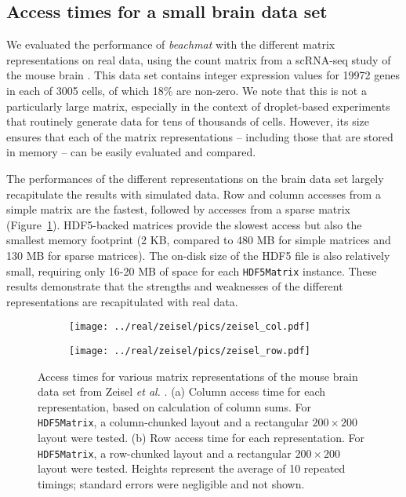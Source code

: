 \documentclass[10pt,letterpaper]{article}
\newcommand{\beachmat}{\textit{beachmat}}
\newcommand{\code}[1]{\texttt{#1}}
\begin{document}
\subsection*{Access times for a small brain data set}
We evaluated the performance of \beachmat{} with the different matrix representations on real data, using the count matrix from a scRNA-seq study of the mouse brain \cite{zeisel2015brain}.
This data set contains integer expression values for 19972 genes in each of 3005 cells, of which 18\% are non-zero.
We note that this is not a particularly large matrix, especially in the context of droplet-based experiments that routinely generate data for tens of thousands of cells.
However, its size ensures that each of the matrix representations -- including those that are stored in memory -- can be easily evaluated and compared.

The performances of the different representations on the brain data set largely recapitulate the results with simulated data.
Row and column accesses from a simple matrix are the fastest, followed by accesses from a sparse matrix (Figure~\ref{fig:zeisel}).
HDF5-backed matrices provide the slowest access but also the smallest memory footprint (2 KB, compared to 480 MB for simple matrices and 130 MB for sparse matrices).
The on-disk size of the HDF5 file is also relatively small, requiring only 16-20 MB of space for each \code{HDF5Matrix} instance. 
These results demonstrate that the strengths and weaknesses of the different representations are recapitulated with real data.

\begin{figure}[bt]
    \begin{subfigure}[b]{0.49\textwidth}
        \texttt{[image: ../real/zeisel/pics/zeisel\_col.pdf]}
        \caption{}
    \end{subfigure}
    \begin{subfigure}[b]{0.49\textwidth}
        \texttt{[image: ../real/zeisel/pics/zeisel\_row.pdf]}
        \caption{}
    \end{subfigure}
    \caption{Access times for various matrix representations of the mouse brain data set from Zeisel \textit{et al.} \cite{zeisel2015brain}.
        (a) Column access time for each representation, based on calculation of column sums.
        For \code{HDF5Matrix}, a column-chunked layout and a rectangular $200 \times 200$ layout were tested.
        (b) Row access time for each representation.
        For \code{HDF5Matrix}, a row-chunked layout and a rectangular $200 \times 200$ layout were tested.
        Heights represent the average of 10 repeated timings; standard errors were negligible and not shown.
    }
    \label{fig:zeisel}
\end{figure}
\end{document}
